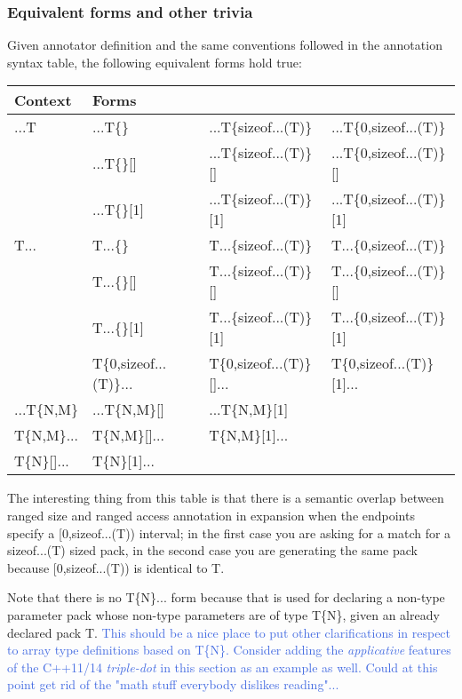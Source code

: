 \subsubsection{Equivalent forms and other trivia}
\p Given annotator definition and the same conventions followed in the annotation syntax table, the following equivalent forms hold true:

\begin{tabularx}{\textwidth}{l | l l l}
  \textbf{Context} & \textbf{Forms} \\
\hline
   ...T & ...T\{\}    & ...T\{sizeof...(T)\}     & ...T\{0,sizeof...(T)\} \\
        & ...T\{\}[]  & ...T\{sizeof...(T)\}[]   & ...T\{0,sizeof...(T)\}[] \\
        & ...T\{\}[1] & ...T\{sizeof...(T)\}[1] & ...T\{0,sizeof...(T)\}[1] \\

   T... & T...\{\} & T...\{sizeof...(T)\} & T...\{0,sizeof...(T)\} \\
        & T...\{\}[] & T...\{sizeof...(T)\}[] & T...\{0,sizeof...(T)\}[] \\
        & T...\{\}[1] & T...\{sizeof...(T)\}[1] & T...\{0,sizeof...(T)\}[1] \\
        & T\{0,sizeof...(T)\}... & T\{0,sizeof...(T)\}[]... & T\{0,sizeof...(T)\}[1]... \\
\hline
 ...T\{N,M\} & ...T\{N,M\}[] & ...T\{N,M\}[1] \\
\hline
   T\{N,M\}... & T\{N,M\}[]... & T\{N,M\}[1]... \\
\hline
   T\{N\}[]... & T\{N\}[1]... \\
\end{tabularx}

\p The interesting thing from this table is that there is a semantic overlap between ranged size and ranged access annotation in expansion when the endpoints specify a [0,sizeof...(T)) interval;
in the first case you are asking for a match for a sizeof...(T) sized pack, in the second case you are generating the same pack because [0,sizeof...(T)) is identical to T.

\p Note that there is no T\{N\}... form because that is used for declaring a non-type parameter pack whose non-type parameters are of type T\{N\}, given an already declared pack T.
\textcolor{RoyalBlue}{This should be a nice place to put other clarifications in respect to
array type definitions based on T\{N\}.
Consider adding the \textit{applicative} features of the C++11/14 \textit{triple-dot} in this section as an example as well.
Could at this point get rid of the "math stuff everybody dislikes reading"...}

